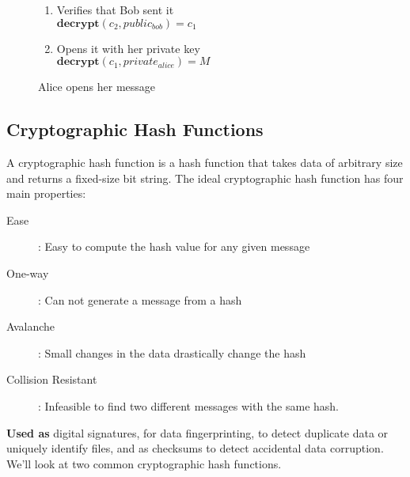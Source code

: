 \documentclass{article}
\begin{document}
		\begin{figure}[h]
			\centering
			\begin{enumerate}
				\item Verifies that Bob sent it \hfill \\
					$\textbf{decrypt}(c_2, public_{bob}) = c_1$
				\item Opens it with her private key \hfill \\
					$\textbf{decrypt}(c_1, private_{alice}) = M$
			\end{enumerate}
			{\caption*{Alice opens her message}}
		\end{figure}

	\subsection{Cryptographic Hash Functions}
		A cryptographic hash function is a hash function that takes data of arbitrary size and returns a fixed-size bit string. The ideal cryptographic hash function has four main properties:
		\begin{description}
			\item[Ease]: Easy to compute the hash value for any given message
			\item[One-way]: Can not generate a message from a hash
			\item[Avalanche]: Small changes in the data drastically change the hash
			\item[Collision Resistant]: Infeasible to find two different messages with the same hash.
		\end{description}
		{\bf Used as} digital signatures, for data fingerprinting, to detect duplicate data or uniquely identify files, and as checksums to detect accidental data corruption. We'll look at two common cryptographic hash functions.
\end{document}
